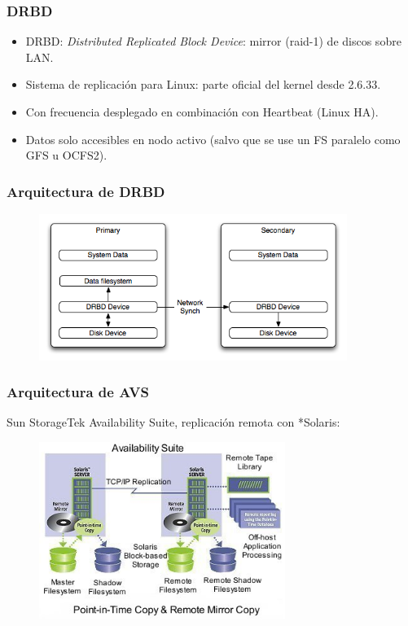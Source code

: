 \documentclass{beamer}
\begin{document}
\begin{frame}
  \frametitle{DRBD}
  \begin{itemize}
    \item DRBD: \textit{Distributed Replicated Block Device}: mirror (raid-1) de discos sobre LAN.
    \item Sistema de replicación para Linux: parte oficial del kernel desde 2.6.33.
    \item Con frecuencia desplegado en combinación con Heartbeat (Linux HA).
    \item Datos solo accesibles en nodo activo (salvo que se use un FS paralelo como GFS u OCFS2).

  \end{itemize}
\end{frame}


\begin{frame}
  \frametitle{Arquitectura de DRBD}

\begin{figure}[h]
\begin{center}
  \includegraphics[width=10cm]{figs/drbd-main.png}
\end{center}
\end{figure}

\end{frame}

\begin{frame}
  \frametitle{Arquitectura de AVS}

Sun StorageTek Availability Suite, replicación remota con *Solaris:

\begin{figure}[h]
\begin{center}
  \includegraphics[width=8cm]{figs/availabilitysuitenew.jpg}
\end{center}
\end{figure}

\end{frame}
\end{document}
